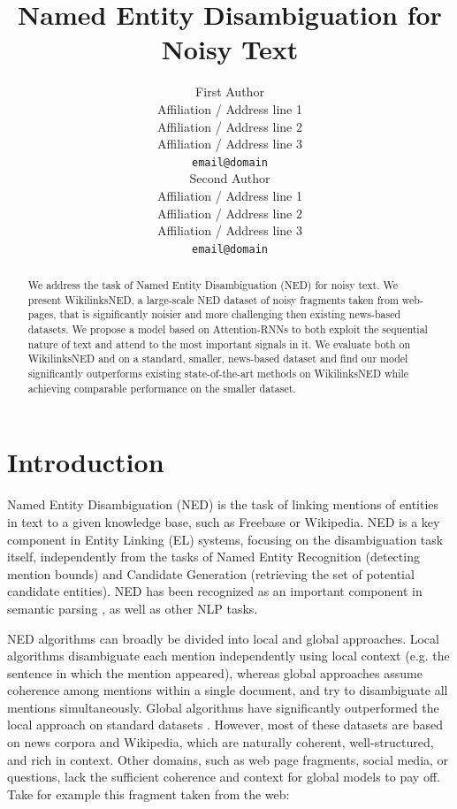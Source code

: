 \documentclass[11pt]{article}
\title{Named Entity Disambiguation for Noisy Text}
\author{First Author \\
	Affiliation / Address line 1 \\
	Affiliation / Address line 2 \\
	Affiliation / Address line 3 \\
	{\tt email@domain} \\\And
	Second Author \\
	Affiliation / Address line 1 \\
	Affiliation / Address line 2 \\
	Affiliation / Address line 3 \\
	{\tt email@domain} \\}
\date{}
\begin{document}
	\maketitle
	\begin{abstract}
		We address the task of Named Entity Disambiguation (NED) for noisy text. 
		We present WikilinksNED, a large-scale NED dataset of noisy fragments taken from web-pages, that is significantly noisier and more challenging then existing news-based datasets.
		We propose a model based on Attention-RNNs to both exploit the sequential nature of text and attend to the most important signals in it.
		We evaluate both on WikilinksNED and on a standard, smaller, news-based dataset and find our model significantly outperforms existing state-of-the-art methods on WikilinksNED while achieving comparable performance on the smaller dataset. 
	\end{abstract}
	
	
	
	\section{Introduction}
		
	Named Entity Disambiguation (NED) is the task of linking mentions of entities in text to a given knowledge base, such as Freebase or Wikipedia. NED is a key component in Entity Linking (EL) systems, focusing on the disambiguation task itself, independently from the tasks of Named Entity Recognition (detecting mention bounds) and Candidate Generation (retrieving the set of potential candidate entities). NED has been recognized as an important component in semantic parsing \cite{berant2013semantic}, as well as other NLP tasks.
	
	NED algorithms can broadly be divided into local and global approaches. Local algorithms disambiguate each mention independently using local context (e.g. the sentence in which the mention appeared), whereas global approaches assume coherence among mentions within a single document, and try to disambiguate all mentions simultaneously. Global algorithms have significantly outperformed the local approach on standard datasets \cite{guo2014entity,pershina2015personalized,Globerson2016}. However, most of these datasets are based on news corpora and Wikipedia, which are naturally coherent, well-structured, and rich in context. Other domains, such as web page fragments, social media, or questions, lack the sufficient coherence and context for global models to pay off. Take for example this fragment taken from the web:
	
\end{document}
